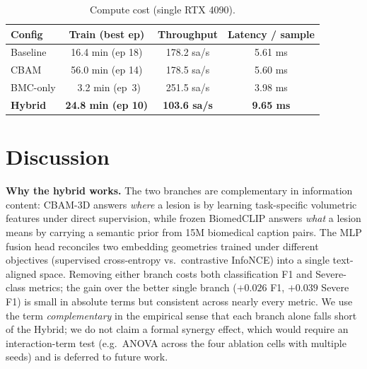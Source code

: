 \documentclass[conference]{IEEEtran}
\begin{document}
\begin{table}[t]
\centering
\caption{Compute cost (single RTX 4090).}
\label{tab:time}
\renewcommand{\arraystretch}{1.05}
\begin{tabular}{@{}lccc@{}}
\toprule
Config   & Train (best ep)  & Throughput   & Latency / sample \\
\midrule
Baseline & 16.4 min (ep 18) & 178.2 sa/s   & 5.61 ms          \\
CBAM     & 56.0 min (ep 14) & 178.5 sa/s   & 5.60 ms          \\
BMC-only & ~3.2 min (ep~3)  & 251.5 sa/s   & 3.98 ms          \\
\textbf{Hybrid} & \textbf{24.8 min (ep 10)} & \textbf{103.6 sa/s} & \textbf{9.65 ms} \\
\bottomrule
\end{tabular}
\end{table}

\section{Discussion}
\label{sec:disc}

\textbf{Why the hybrid works.} The two branches are complementary in
information content: CBAM-3D answers \emph{where} a lesion is by
learning task-specific volumetric features under direct supervision,
while frozen BiomedCLIP answers \emph{what} a lesion means by carrying
a semantic prior from 15M biomedical caption pairs. The MLP fusion
head reconciles two embedding geometries trained under different
objectives (supervised cross-entropy vs.\ contrastive InfoNCE) into a
single text-aligned space. Removing either branch costs both
classification F1 and Severe-class metrics; the gain over the better
single branch ($+0.026$ F1, $+0.039$ Severe F1) is small in absolute
terms but consistent across nearly every metric. We use the term
\emph{complementary} in the empirical sense that each branch alone
falls short of the Hybrid; we do not claim a formal synergy effect,
which would require an interaction-term test (e.g.\ ANOVA across
the four ablation cells with multiple seeds) and is deferred to
future work.
\end{document}
